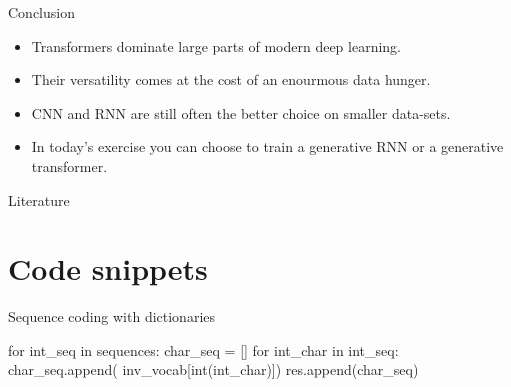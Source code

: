 \documentclass{beamer}
\begin{document}
    \begin{frame}{Conclusion}
      \begin{itemize}
        \item Transformers dominate large parts of modern deep learning.
        \item Their versatility comes at the cost of an enourmous data hunger.
        \item CNN and RNN are still often the better choice on smaller data-sets.
        \item In today's exercise you can choose to train a generative RNN or a generative
         transformer.
      \end{itemize}
    \end{frame}

    \begin{frame}[allowframebreaks]{Literature}
      \printbibliography
    \end{frame}

    \section{Code snippets}
    \begin{frame}[fragile]{Sequence coding with dictionaries}
    \begin{python}
      for int_seq in sequences:
      char_seq = []
      for int_char in int_seq:
          char_seq.append(
            inv_vocab[int(int_char)])
      res.append(char_seq)
    \end{python}
    \end{frame}
\end{document}

